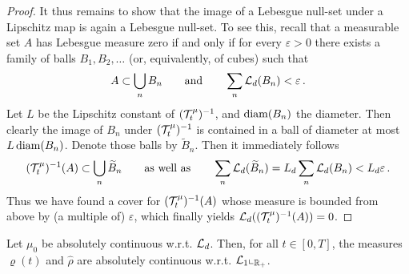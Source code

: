 \begin{proof}
	It thus remains to show that the image of a Lebesgue null-set under a Lipschitz map is again a Lebesgue null-set. To see this,
	recall that a measurable set $A$ has Lebesgue measure zero if and only if for every $\varepsilon>0$ there exists a
	family of balls $B_1,B_2,\ldots$ (or, equivalently, of cubes) such that
	\begin{align*}
		A\subset\bigcup_n B_n\qquad\text{and}\qquad\sum_n\mathcal{L}_d(B_n)<\varepsilon\,.
	\end{align*}
	Let $L$ be the Lipschitz constant of $(\mathcal{T}^\mu_t)^{-1}$, and $\operatorname{diam}(B_n)$ the diameter. Then clearly the image of
	$B_n$ under $(\mathcal{T}^\mu_t)^{-1}$ is contained in a ball of diameter at most $L\operatorname{diam}(B_n)$. Denote those balls by
	$\widetilde B_n$.
	Then it immediately follows
	\begin{align*}
		(\mathcal{T}^\mu_t)^{-1}(A)\subset\bigcup_n\widetilde B_n\qquad\text{as well as}\qquad
		\sum_n\mathcal{L}_d(\widetilde B_n)=L_d\sum_n\mathcal{L}_d(B_n)<L_d\varepsilon\,.
	\end{align*}
	Thus we have found a cover for $(\mathcal{T}^\mu_t)^{-1}(A)$ whose measure is bounded from above by (a multiple of) $\varepsilon$, which finally
	yields $\mathcal{L}_d((\mathcal{T}^\mu_t)^{-1}(A))=0$.
\end{proof}

\begin{lemma}\label{le-abs}
	Let $\mu_0$ be absolutely continuous w.r.t. $\mathcal{L}_d$. Then, for all $t\in [0,T]$, the measures $\varrho(t)$ and $\widehat  \rho$ are absolutely
	continuous w.r.t. $\mathcal{L}_1\llcorner_{\mathbb{R}_+}$.
\end{lemma}

